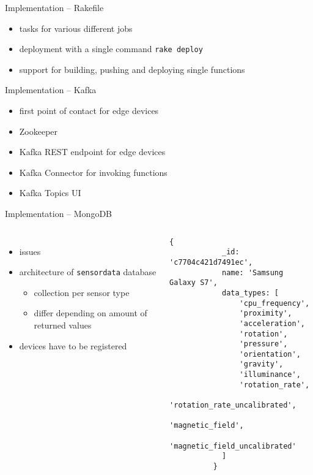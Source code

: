 \documentclass[aspectratio=1610]{beamer}
\begin{document}
  \begin{frame}{Implementation -- Rakefile}
    \begin{itemize}
      \item tasks for various different jobs
      \item deployment with a single command \lstinline{rake deploy}
      \item support for building, pushing and deploying single functions
    \end{itemize}
  \end{frame}

  \begin{frame}{Implementation -- Kafka}
    \begin{itemize}
      \item first point of contact for edge devices
      \item Zookeeper
      \item Kafka REST endpoint for edge devices
      \item Kafka Connector for invoking functions
      \item Kafka Topics UI
    \end{itemize}
  \end{frame}

  \begin{frame}[fragile]{Implementation -- MongoDB}
    \begin{columns}
        \begin{itemize}
          \item issues
          \item architecture of \texttt{sensordata} database
            \begin{itemize}
              \item collection per sensor type
              \item differ depending on amount of returned values
            \end{itemize}
          \item devices have to be registered
        \end{itemize}
          \begin{lstlisting}[language=mongo, basicstyle=\scriptsize\ttfamily]
          {
            _id: 'c7704c421d7491ec',
            name: 'Samsung Galaxy S7',
            data_types: [
                'cpu_frequency',
                'proximity',
                'acceleration',
                'rotation',
                'pressure',
                'orientation',
                'gravity',
                'illuminance',
                'rotation_rate',
                'rotation_rate_uncalibrated',
                'magnetic_field',
                'magnetic_field_uncalibrated'
            ]
          }
          \end{lstlisting}
     \end{columns}
  \end{frame}
\end{document}
